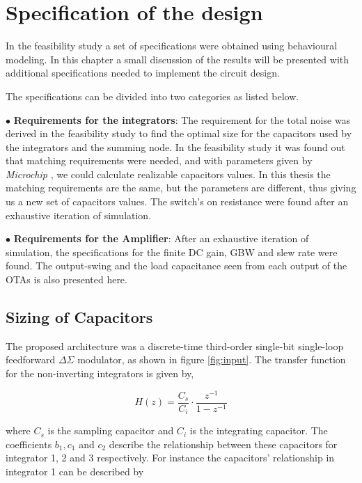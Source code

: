 \chapter{Specification of the design}\label{specifiation}
In the feasibility study a set of specifications were obtained using behavioural modeling. In this chapter a small discussion of the results will be presented with additional specifications needed to implement the circuit design.

The specifications can be divided into two categories as listed below. 

$\bullet$ \textbf{Requirements for the integrators}: The requirement for the total noise was derived in the feasibility study to find the optimal size for the capacitors used by the integrators and the summing node. In the feasibility study it was found out that matching requirements were needed, and with parameters given by \textit{Microchip} \cite{private}, we could calculate realizable capacitors values. In this thesis the matching requirements are the same, but the parameters are different, thus giving us a new set of capacitors values. The switch's on resistance were found after an exhaustive iteration of simulation.

$\bullet$ \textbf{Requirements for the Amplifier}: After an exhaustive iteration of simulation, the specifications for the finite DC gain, GBW and slew rate were found. The output-swing and the load capacitance seen from each output of the OTAs is also presented here. 

\section{Sizing of Capacitors}
The proposed architecture was a discrete-time third-order single-bit single-loop feedforward $\Delta\Sigma$ modulator, as shown in figure \ref{fig:input}. The transfer function for the non-inverting integrators is given by,

\begin{equation}\label{transfer_integrator}
    H(z) = \frac{C_s}{C_i}\cdot \frac{z^{-1}}{1 - z^{-1}}
\end{equation}

where $C_s$ is the sampling capacitor and $C_i$ is the integrating capacitor. The coefficients $b_1, c_1$ and $c_2$ describe the relationship between these capacitors for integrator 1, 2 and 3 respectively. For instance the capacitors' relationship in integrator 1 can be described by

